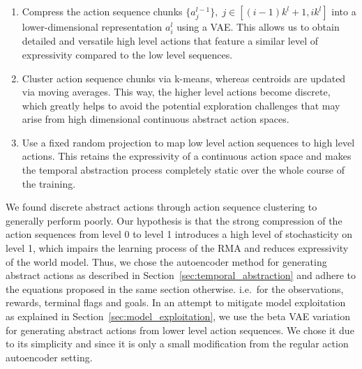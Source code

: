 \documentclass{article}
\begin{document}
\begin{enumerate}
    \item Compress the action sequence chunks $\{a_j^{l-1}\}, \; j \in [(i-1)k^l + 1, ik^l]$ into a lower-dimensional representation $a_i^l$ using a VAE. This allows us to obtain detailed and versatile high level actions that feature a similar level of expressivity compared to the low level sequences.
    \item Cluster action sequence chunks via k-means, whereas centroids are updated via moving averages. This way, the higher level actions become discrete, which greatly helps to avoid the potential exploration challenges that may arise from high dimensional continuous abstract action spaces.
    \item Use a fixed random projection to map low level action sequences to high level actions. This retains the expressivity of a continuous action space and makes the temporal abstraction process completely static over the whole course of the training.
\end{enumerate}

We found discrete abstract actions through action sequence clustering to generally perform poorly. Our hypothesis is that the strong compression of the action sequences from level 0 to level 1 introduces a high level of stochasticity on level 1, which impairs the learning process of the RMA and reduces expressivity of the world model. Thus, we chose the autoencoder method for generating abstract actions as described in Section~\ref{sec:temporal_abstraction} and adhere to the equations proposed in the same section otherwise. i.e.\ for the observations, rewards, terminal flags and goals. In an attempt to mitigate model exploitation as explained in Section~\ref{sec:model_exploitation}, we use the beta VAE variation for generating abstract actions from lower level action sequences. We chose it due to its simplicity and since it is only a small modification from the regular action autoencoder setting. 
\end{document}
